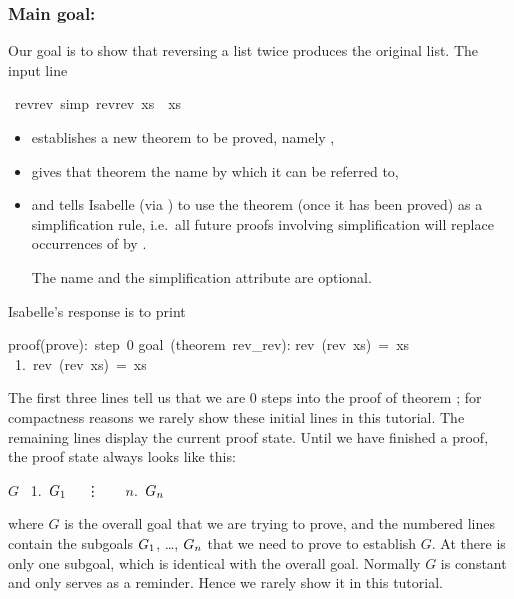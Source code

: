 \begin{isabellebody}
\begin{isamarkuptext}
\subsubsection*{Main goal: }

Our goal is to show that reversing a list twice produces the original
list. The input line%
\end{isamarkuptext}%
\ rev{\isacharunderscore}rev\ {\isacharbrackleft}simp{\isacharbrackright}{\isacharcolon}\ {\isachardoublequote}rev{\isacharparenleft}rev\ xs{\isacharparenright}\ {\isacharequal}\ xs{\isachardoublequote}%
\begin{isamarkuptxt}%
\begin{itemize}
\item
establishes a new theorem to be proved, namely ,
\item
gives that theorem the name  by which it can be
referred to,
\item
and tells Isabelle (via ) to use the theorem (once it has been
proved) as a simplification rule, i.e.\ all future proofs involving
simplification will replace occurrences of  by
.

The name and the simplification attribute are optional.
\end{itemize}
Isabelle's response is to print
\begin{isabelle}
proof(prove):~step~0\isanewline
\isanewline
goal~(theorem~rev\_rev):\isanewline
rev~(rev~xs)~=~xs\isanewline
~1.~rev~(rev~xs)~=~xs
\end{isabelle}
The first three lines tell us that we are 0 steps into the proof of
theorem ; for compactness reasons we rarely show these
initial lines in this tutorial. The remaining lines display the current
proof state.
Until we have finished a proof, the proof state always looks like this:
\begin{isabelle}
$G$\isanewline
~1.~$G\sb{1}$\isanewline
~~\vdots~~\isanewline
~$n$.~$G\sb{n}$
\end{isabelle}
where $G$
is the overall goal that we are trying to prove, and the numbered lines
contain the subgoals $G\sb{1}$, \dots, $G\sb{n}$ that we need to prove to
establish $G$. At  there is only one subgoal, which is
identical with the overall goal.  Normally $G$ is constant and only serves as
a reminder. Hence we rarely show it in this tutorial.


\end{isamarkuptxt}
\end{isabellebody}
